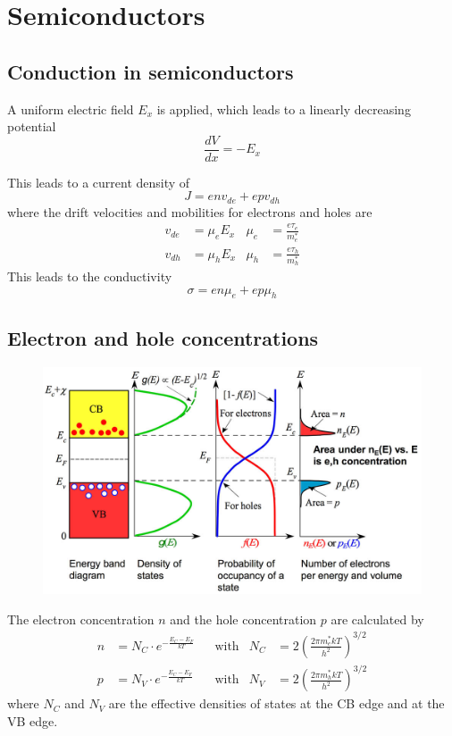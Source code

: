 \section{Semiconductors}

\subsection{Conduction in semiconductors}
A uniform electric field $E_x$ is applied, which leads to a linearly decreasing potential
\begin{equation}
    \frac{dV}{dx} = -E_x
\end{equation}


This leads to a current density of
\begin{equation}
    J = e n v_{de} + e p v_{dh}
\end{equation}
where the drift velocities and mobilities for electrons and holes are
\begin{align*}
    v_{de} &= \mu_e E_x & \mu_e &= \frac{e \tau_e}{m_e^*} \\
    v_{dh} &= \mu_h E_x & \mu_h &= \frac{e \tau_h}{m_h^*}
\end{align*}
This leads to the conductivity
\begin{equation}
    \sigma = e n \mu_e + e p \mu_h
\end{equation}

\subsection{Electron and hole concentrations}
\begin{figure}[h!]
    \centering
    \includegraphics[width=0.6\linewidth]{images/semicond_elec_hole_concentration.jpg}
\end{figure}

The electron concentration $n$ and the hole concentration $p$ are calculated by
\begin{align}
    n &= N_C \cdot e^{-\frac{E_C-E_F}{k T}} && \text{with} & N_C &= 2 \left( \frac{2 \pi m_e^* k T}{h^2} \right)^{3/2} \\
    p &= N_V \cdot e^{-\frac{E_C-E_F}{k T}} && \text{with} & N_V &= 2 \left( \frac{2 \pi m_h^* k T}{h^2} \right)^{3/2}
\end{align}
where $N_C$ and $N_V$ are the effective densities of states at the CB edge and at the VB edge.

